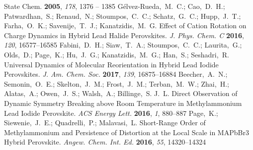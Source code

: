 \documentclass[journal=jpccck,manuscript=article,layout=twocolumn]{achemso}
\begin{document}
\begin{mcitethebibliography}{62}
{  State Chem.} \textbf{2005}, \emph{178}, 1376 -- 1385\relax
\mciteBstWouldAddEndPuncttrue
\mciteSetBstMidEndSepPunct{\mcitedefaultmidpunct}
{\mcitedefaultendpunct}{\mcitedefaultseppunct}\relax
\EndOfBibitem
{}
Gélvez-Rueda,~M.~C.; Cao,~D.~H.; Patwardhan,~S.; Renaud,~N.; Stoumpos,~C.~C.;
  Schatz,~G.~C.; Hupp,~J.~T.; Farha,~O.~K.; Savenije,~T.~J.; Kanatzidis,~M.~G.
    Effect of Cation Rotation on Charge Dynamics in Hybrid Lead
  Halide Perovskites. \emph{J. Phys. Chem. C} \textbf{2016}, \emph{120},
  16577--16585\relax
\mciteBstWouldAddEndPuncttrue
\mciteSetBstMidEndSepPunct{\mcitedefaultmidpunct}
{\mcitedefaultendpunct}{\mcitedefaultseppunct}\relax
\EndOfBibitem
{}
Fabini,~D.~H.; Siaw,~T.~A.; Stoumpos,~C.~C.; Laurita,~G.; Olds,~D.; Page,~K.;
  Hu,~J.~G.; Kanatzidis,~M.~G.; Han,~S.; Seshadri,~R. Universal Dynamics of
  Molecular Reorientation in Hybrid Lead Iodide Perovskites. \emph{J. Am. Chem.
  Soc.} \textbf{2017}, \emph{139}, 16875--16884\relax
\mciteBstWouldAddEndPuncttrue
\mciteSetBstMidEndSepPunct{\mcitedefaultmidpunct}
{\mcitedefaultendpunct}{\mcitedefaultseppunct}\relax
\EndOfBibitem
{}
Beecher,~A.~N.; Semonin,~O.~E.; Skelton,~J.~M.; Frost,~J.~M.; Terban,~M.~W.;
  Zhai,~H.; Alatas,~A.; Owen,~J.~S.; Walsh,~A.; Billinge,~S. J.~L. Direct
  Observation of Dynamic Symmetry Breaking above Room Temperature in
  Methylammonium Lead Iodide Perovskite. \emph{ACS Energy Lett.} \textbf{2016},
  \emph{1}, 880--887\relax
\mciteBstWouldAddEndPuncttrue
\mciteSetBstMidEndSepPunct{\mcitedefaultmidpunct}
{\mcitedefaultendpunct}{\mcitedefaultseppunct}\relax
\EndOfBibitem
{}
Page,~K.; Siewenie,~J.~E.; Quadrelli,~P.; Malavasi,~L. Short-Range Order of
  Methylammonium and Persistence of Distortion at the Local Scale in MAPbBr3
  Hybrid Perovskite. \emph{Angew. Chem. Int. Ed.} \textbf{2016}, \emph{55},
  14320--14324\relax
\mciteBstWouldAddEndPuncttrue
\mciteSetBstMidEndSepPunct{\mcitedefaultmidpunct}
{\mcitedefaultendpunct}{\mcitedefaultseppunct}\relax
\EndOfBibitem
{}

\end{mcitethebibliography}
\end{document}
